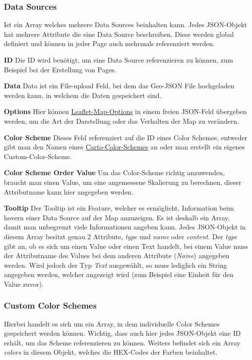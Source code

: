 \subsubsection{Data Sources}
Ist ein Array welches mehrere Data Sources beinhalten kann.
Jedes JSON-Objekt hat mehrere Attribute die eine Data Source beschreiben.
Diese werden global definiert und können in jeder Page auch mehrmals referenziert werden.

\textbf{ID}
Die ID wird benötigt, um eine Data Source referenzieren zu können, zum Beispiel bei der Erstellung von Pages.

\textbf{Data}
Data ist ein File-upload Feld, bei dem das Geo-JSON File hochgeladen werden kann, in welchem die Daten gespeichert sind.

\textbf{Options}
Hier können \href{https://leafletjs.com/SlavaUkraini/reference.html#map-option}{Leaflet-Map-Options} in einem freien JSON-Feld
übergeben werden, um die Art der Darstellung oder das Verhalten der Map zu verändern.

\textbf{Color Scheme}
Dieses Feld referenziert auf die ID eines Color Schemes, entweder gibt man den Namen eines
\href{https://carto.com/carto-colors/}{Carto-Color-Schemes} an oder man erstellt ein eigenes Custom-Color-Scheme.

\textbf{Color Scheme Order Value}
Um das Color-Scheme richtig anzuwenden, braucht man einen Value, um eine angemessene Skalierung zu berechnen, dieser Attributname
kann hier angegeben werden.

\textbf{Tooltip}
Der Tooltip ist ein Feature, welcher es ermöglicht, Information beim hovern einer Data Source auf der Map anzuzeigen.
Es ist deshalb ein Array, damit man unbegrenzt viele Informationen angeben kann.
Jedes JSON-Objekt in diesem Array besitzt genau 2 Attribute, \emph{type} und \emph{name} oder \emph{content}.
Der \emph{type} gibt an, ob es sich um einen Value oder einen Text handelt, bei einem Value muss der Attributname des
Values bei dem anderen Attribute (\emph{Name}) angegeben werden.
Wird jedoch der Typ \emph{Text} ausgewählt, so muss lediglich ein String angegeben werden, welcher angezeigt wird (zum Beispiel
eine Einheit für den Value zuvor).

\subsubsection{Custom Color Schemes}
Hierbei handelt es sich um ein Array, in dem individuelle Color Schemes gespeichert werden können.
Wichtig, dass auch hier jedes JSON-Objekt eine ID erhält, um das Scheme referenzieren zu können.
Weiters befindet sich ein Array \emph{colors} in diesem Objekt, welches die HEX-Codes der Farben beinhaltet.

